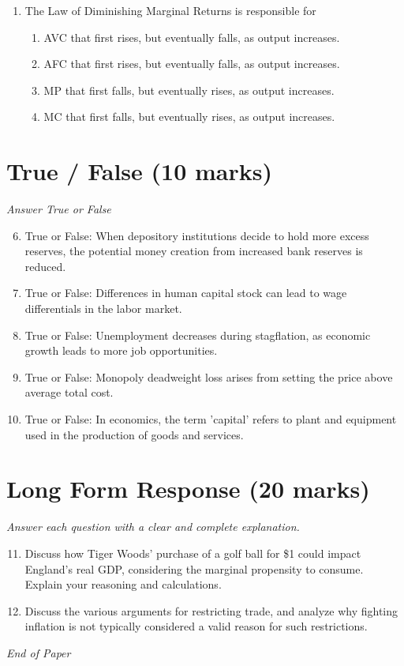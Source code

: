 \documentclass[12pt]{article}
\begin{document}
\begin{enumerate}[label=\arabic*.]
\begin{enumerate}[label=(\alph*)]
    \item \$20
    \item \$180
    \item \$2,000
    \item Greater than $200 but less than $500
\end{enumerate}
\item The Law of Diminishing Marginal Returns is responsible for
\begin{enumerate}[label=(\alph*)]
    \item AVC that first rises, but eventually falls, as output increases.
    \item AFC that first rises, but eventually falls, as output increases.
    \item MP that first falls, but eventually rises, as output increases.
    \item MC that first falls, but eventually rises, as output increases.
\end{enumerate}
\end{enumerate}

\section*{True / False (10 marks)}
\textit{Answer True or False}
\begin{enumerate}[label=\arabic*.]
\setcounter{enumi}{5}
\item True or False: When depository institutions decide to hold more excess reserves, the potential money creation from increased bank reserves is reduced.
\item True or False: Differences in human capital stock can lead to wage differentials in the labor market.
\item True or False: Unemployment decreases during stagflation, as economic growth leads to more job opportunities.
\item True or False: Monopoly deadweight loss arises from setting the price above average total cost.
\item True or False: In economics, the term 'capital' refers to plant and equipment used in the production of goods and services.
\end{enumerate}

\section*{Long Form Response (20 marks)}
\textit{Answer each question with a clear and complete explanation.}
\begin{enumerate}[label=\arabic*.]
\setcounter{enumi}{10}
\item Discuss how Tiger Woods' purchase of a golf ball for \$1 could impact England's real GDP, considering the marginal propensity to consume. Explain your reasoning and calculations.
\item Discuss the various arguments for restricting trade, and analyze why fighting inflation is not typically considered a valid reason for such restrictions.
\end{enumerate}

\vfill
\noindent\textit{End of Paper}
\end{document}
